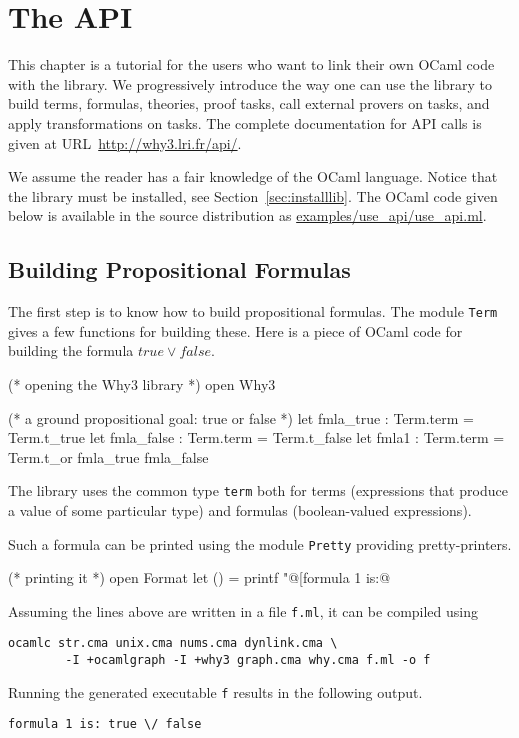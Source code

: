 \chapter{The \why API}
\label{chap:api}

This chapter is a tutorial for the users who want to link their own
OCaml code with the \why library. We progressively introduce the way
one can use the library to build terms, formulas, theories, proof
tasks, call external provers on tasks, and apply transformations on
tasks. The complete documentation for API calls is given
at URL~\url{http://why3.lri.fr/api/}.

We assume the reader has a fair knowledge of the OCaml
language. Notice that the \why library must be installed, see
Section~\ref{sec:installlib}. The OCaml code given below is available in
the source distribution as \url{examples/use_api/use_api.ml}.


\section{Building Propositional Formulas}

The first step is to know how to build propositional formulas. The
module \texttt{Term} gives a few functions for building these. Here is
a piece of OCaml code for building the formula $true \lor false$.
\begin{ocamlcode}
(* opening the Why3 library *)
open Why3

(* a ground propositional goal: true or false *)
let fmla_true : Term.term = Term.t_true
let fmla_false : Term.term = Term.t_false
let fmla1 : Term.term = Term.t_or fmla_true fmla_false
\end{ocamlcode}
The library uses the common type \texttt{term} both for terms
(\ie expressions that produce a value of some particular type)
and formulas (\ie boolean-valued expressions).

Such a formula can be printed using the module \texttt{Pretty}
providing pretty-printers.
\begin{ocamlcode}
(* printing it *)
open Format
let () = printf "@[formula 1 is:@ %
\end{ocamlcode}

Assuming the lines above are written in a file \texttt{f.ml}, it can
be compiled using
\begin{verbatim}
ocamlc str.cma unix.cma nums.cma dynlink.cma \
        -I +ocamlgraph -I +why3 graph.cma why.cma f.ml -o f
\end{verbatim}
Running the generated executable \texttt{f} results in the following output.
\begin{verbatim}
formula 1 is: true \/ false
\end{verbatim}

